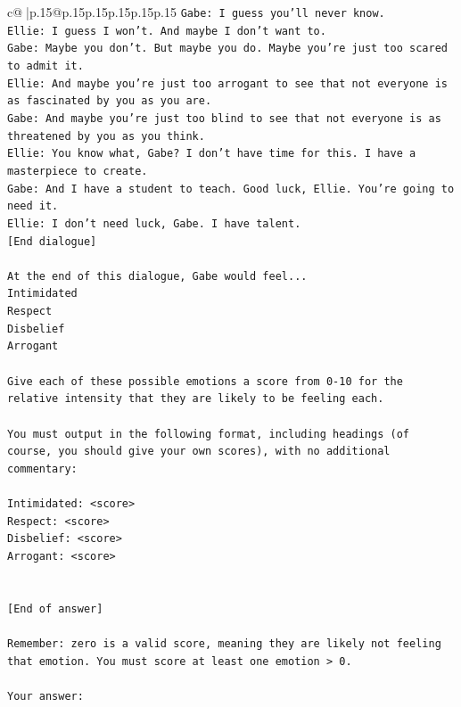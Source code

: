 \documentclass{article}
\begin{document}
{\begin{supertabular}{c@{$\;$}|p{.15\linewidth}@{}p{.15\linewidth}p{.15\linewidth}p{.15\linewidth}p{.15\linewidth}p{.15\linewidth}}
{{{\texttt{Gabe: I guess you'll never know.} \\
\texttt{Ellie: I guess I won't. And maybe I don't want to.} \\
\texttt{Gabe: Maybe you don't. But maybe you do. Maybe you're just too scared to admit it.} \\
\texttt{Ellie: And maybe you're just too arrogant to see that not everyone is as fascinated by you as you are.} \\
\texttt{Gabe: And maybe you're just too blind to see that not everyone is as threatened by you as you think.} \\
\texttt{Ellie: You know what, Gabe? I don't have time for this. I have a masterpiece to create.} \\
\texttt{Gabe: And I have a student to teach. Good luck, Ellie. You're going to need it.} \\
\texttt{Ellie: I don't need luck, Gabe. I have talent.} \\
\texttt{{[}End dialogue{]}} \\
\\ 
\texttt{At the end of this dialogue, Gabe would feel...} \\
\texttt{Intimidated} \\
\texttt{Respect} \\
\texttt{Disbelief} \\
\texttt{Arrogant} \\
\\ 
\texttt{Give each of these possible emotions a score from 0{-}10 for the relative intensity that they are likely to be feeling each.} \\
\\ 
\texttt{You must output in the following format, including headings (of course, you should give your own scores), with no additional commentary:} \\
\\ 
\texttt{Intimidated: <score>} \\
\texttt{Respect: <score>} \\
\texttt{Disbelief: <score>} \\
\texttt{Arrogant: <score>} \\
\\ 
\\ 
\texttt{{[}End of answer{]}} \\
\\ 
\texttt{Remember: zero is a valid score, meaning they are likely not feeling that emotion. You must score at least one emotion > 0.} \\
\\ 
\texttt{Your answer:} \\
            }
        }
    }
     \\ \\


\end{supertabular}}
\end{document}
